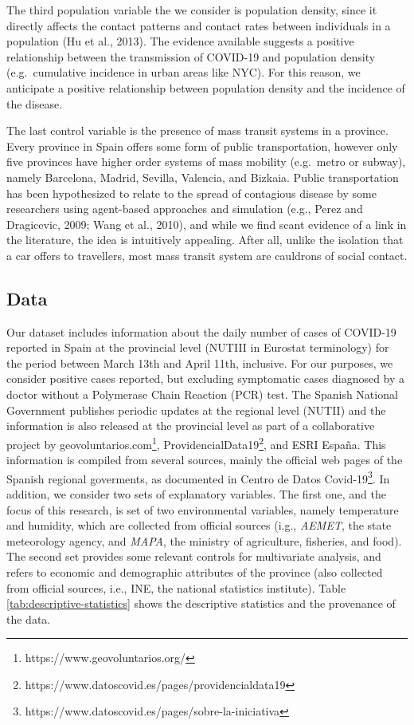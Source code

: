 \documentclass[]{elsarticle} %
\begin{document}
The third population variable the we consider is population density,
since it directly affects the contact patterns and contact rates between
individuals in a population (Hu et al., 2013). The evidence available
suggests a positive relationship between the transmission of COVID-19
and population density (e.g.~cumulative incidence in urban areas like
NYC). For this reason, we anticipate a positive relationship between
population density and the incidence of the disease.

The last control variable is the presence of mass transit systems in a
province. Every province in Spain offers some form of public
transportation, however only five provinces have higher order systems of
mass mobility (e.g.~metro or subway), namely Barcelona, Madrid, Sevilla,
Valencia, and Bizkaia. Public transportation has been hypothesized to
relate to the spread of contagious disease by some researchers using
agent-based approaches and simulation (e.g., Perez and Dragicevic, 2009;
Wang et al., 2010), and while we find scant evidence of a link in the
literature, the idea is intuitively appealing. After all, unlike the
isolation that a car offers to travellers, most mass transit system are
cauldrons of social contact.

\hypertarget{data}{%
\subsection{Data}\label{data}}

Our dataset includes information about the daily number of cases of
COVID-19 reported in Spain at the provincial level (NUTIII in Eurostat
terminology) for the period between March 13th and April 11th,
inclusive. For our purposes, we consider positive cases reported, but
excluding symptomatic cases diagnosed by a doctor without a Polymerase
Chain Reaction (PCR) test. The Spanish National Government publishes
periodic updates at the regional level (NUTII) and the information is
also released at the provincial level as part of a collaborative project
by geovoluntarios.com\footnote{https://www.geovoluntarios.org/},
ProvidencialData19\footnote{https://www.datoscovid.es/pages/providencialdata19},
and ESRI España. This information is compiled from several sources,
mainly the official web pages of the Spanish regional goverments, as
documented in Centro de Datos
Covid-19\footnote{https://www.datoscovid.es/pages/sobre-la-iniciativa}.
In addition, we consider two sets of explanatory variables. The first
one, and the focus of this research, is set of two environmental
variables, namely temperature and humidity, which are collected from
official sources (i.g., \emph{AEMET}, the state meteorology agency, and
\emph{MAPA}, the ministry of agriculture, fisheries, and food). The
second set provides some relevant controls for multivariate analysis,
and refers to economic and demographic attributes of the province (also
collected from official sources, i.e., INE, the national statistics
institute). Table \ref{tab:descriptive-statistics} shows the descriptive
statistics and the provenance of the data.
\end{document}
